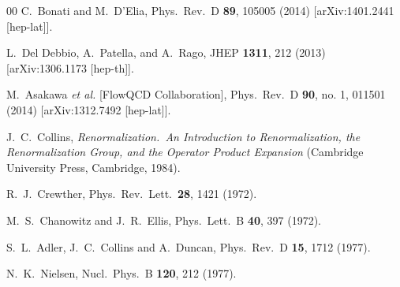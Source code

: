 \begin{thebibliography}{00}
  C.~Bonati and M.~D'Elia,
  Phys.\ Rev.\ D {\bf 89}, 105005 (2014)
  [arXiv:1401.2441 [hep-lat]].

  L.~Del Debbio, A.~Patella, and A.~Rago,
  JHEP {\bf 1311}, 212 (2013)
  [arXiv:1306.1173 [hep-th]].

  M.~Asakawa {\it et al.}  [FlowQCD Collaboration],
  Phys.\ Rev.\ D {\bf 90}, no. 1, 011501 (2014)
  [arXiv:1312.7492 [hep-lat]].

  J.~C.~Collins,
  {\it Renormalization.\ An Introduction to Renormalization, the Renormalization Group, and the Operator Product Expansion\/}
  (Cambridge University Press, Cambridge, 1984).

  R.~J.~Crewther,
  Phys.\ Rev.\ Lett.\  {\bf 28}, 1421 (1972).

  M.~S.~Chanowitz and J.~R.~Ellis,
  Phys.\ Lett.\ B {\bf 40}, 397 (1972).

  S.~L.~Adler, J.~C.~Collins and A.~Duncan,
  Phys.\ Rev.\ D {\bf 15}, 1712 (1977).

  N.~K.~Nielsen,
  Nucl.\ Phys.\ B {\bf 120}, 212 (1977).


\end{thebibliography}
